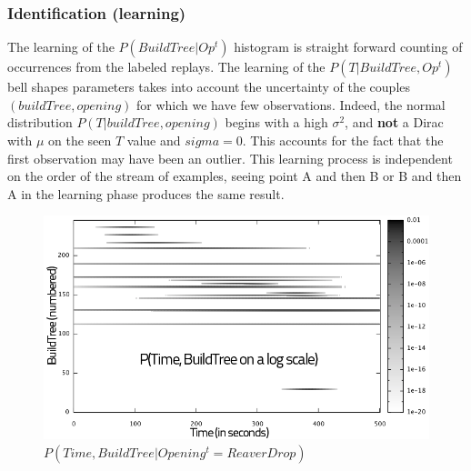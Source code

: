 \subsubsection{Identification (learning)}
The learning of the $P(BuildTree | Op^t)$ histogram is straight forward counting of occurrences from the labeled replays. The learning of the $P(T | BuildTree, Op^t)$ bell shapes parameters takes into account the uncertainty of the couples $(buildTree, opening)$ for which we have few observations. Indeed, the normal distribution $P(T|buildTree, opening)$ begins with a high $\sigma^2$, and \textbf{not} a Dirac with $\mu$ on the seen $T$ value and $sigma=0$. This accounts for the fact that the first observation may have been an outlier. This learning process is independent on the order of the stream of examples, seeing point A and then B or B and then A in the learning phase produces the same result. 

\begin{figure}[htp]
\centerline{\includegraphics[width=1.0\columnwidth]{images/BW_HeatMap_knowing_ReaverDrop.png}}
\caption{$P(Time, BuildTree | Opening^t=ReaverDrop)$}
\label{noise}
\end{figure}



